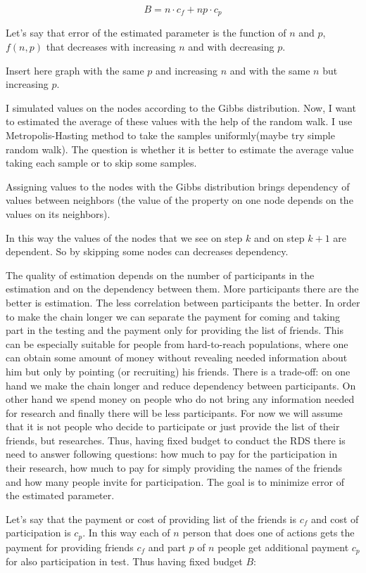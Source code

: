 \documentclass[12pt]{report}
\begin{document}
$$B = n \cdot c_f + np \cdot c_p$$

Let's say that error of the estimated parameter is the function of $n$ and $p$, $f(n,p)$ that decreases with increasing $n$ and with decreasing $p$.

Insert here graph with the same $p$ and increasing $n$ and with the same $n$ but increasing $p$.

I simulated values on the nodes  according to the Gibbs distribution. Now, I want to estimated the average of these values with the help of the random walk. I use Metropolis-Hasting method to take the samples uniformly(maybe try simple random walk). The question is whether it is better to estimate the average value taking each sample or to skip some samples. 

Assigning values to the nodes with the Gibbs distribution brings dependency of values between neighbors (the value of the property on one node depends on the values on its neighbors).

In this way the values of the nodes that we see on step $k$ and on step $k + 1$ are dependent. So by skipping some nodes can decreases dependency. 


The quality of estimation depends on the number of participants in the estimation and on the dependency between them. More participants there are the better is estimation. The less correlation between participants the better.
In order to make the chain longer we can separate the payment for coming and taking part in the testing and the payment only for providing the list of friends.
This can be especially suitable for people from hard-to-reach populations, where one can obtain some amount of money without revealing needed information about him but only by pointing (or recruiting) his friends. There is a trade-off: on one hand we make the chain longer and reduce dependency between participants. On other hand we spend money on people who do not bring any information needed for research and finally there will be less participants. 
For now we will assume that it is not people who decide to participate or just provide the list of their friends, but researches. Thus, having fixed budget to conduct the RDS there is need to answer following questions: how much to pay for the participation in their research, how much to pay for simply providing the names of the friends and how many people invite for participation. The goal is to minimize error of the estimated parameter.

Let's say that the payment or cost of providing list of the friends is $c_f$ and cost of participation is $c_p$. In this way each of $n$ person that does one of actions gets the payment for providing friends $c_f$ and part $p$ of $n$ people get additional payment $c_p$ for also participation in test.
Thus having fixed budget $B$:
\end{document}
